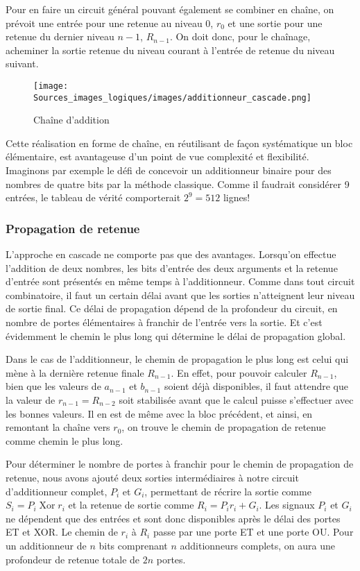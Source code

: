 \documentclass[11pt]{article}
\begin{document}
Pour en faire un circuit général pouvant également se combiner en
chaîne, on prévoit une entrée pour une retenue au niveau 0, \(r_0\) et
une sortie pour une retenue du dernier niveau \(n-1\), \(R_{n-1}\). On
doit donc, pour le chaînage, acheminer la sortie retenue du niveau
courant à l'entrée de retenue du niveau suivant.


\begin{figure}[htbp]
\centering
\texttt{[image: Sources\_images\_logiques/images/additionneur\_cascade.png]}
\caption{\label{fig:org24229ef}Chaîne d'addition}
\end{figure}

Cette réalisation en forme de chaîne, en réutilisant de façon
systématique un bloc élémentaire, est avantageuse d'un point de vue
complexité et flexibilité. Imaginons par exemple le défi de concevoir
un additionneur binaire pour des nombres de quatre bits par la méthode
classique. Comme il faudrait considérer 9 entrées, le tableau de
vérité comporterait \(2^9= 512\) lignes!

\subsubsection{Propagation de retenue}
\label{sec:org4957219}

L'approche en cascade ne comporte pas que des avantages. Lorsqu'on
effectue l'addition de deux nombres, les bits d'entrée des deux
arguments et la retenue d'entrée sont présentés en même temps à
l'additionneur.  Comme dans tout circuit combinatoire, il faut un
certain délai avant que les sorties n'atteignent leur niveau de sortie
final.  Ce délai de propagation dépend de la profondeur du circuit, en
nombre de portes élémentaires à franchir de l'entrée vers la
sortie.  Et c'est évidemment le chemin le plus long qui détermine le
délai de propagation global.  

Dans le cas de l'additionneur, le chemin de propagation le plus long
est celui qui mène à la dernière retenue finale \(R_{n-1}\).  En
effet, pour pouvoir calculer \(R_{n-1}\), bien que les valeurs de
\(a_{n-1}\) et \(b_{n-1}\) soient déjà disponibles, il faut attendre
que la valeur de \(r_{n-1} = R_{n-2}\) soit stabilisée avant que le
calcul puisse s'effectuer avec les bonnes valeurs. Il en est de même
avec la bloc précédent, et ainsi, en remontant la chaîne vers \(r_0\),
on trouve le chemin de propagation de retenue comme chemin le plus
long.

Pour déterminer le nombre de portes à franchir pour le chemin de
propagation de retenue, nous avons ajouté deux sorties intermédiaires
à notre circuit d'additionneur complet, \(P_i\) et \(G_i\), permettant
de récrire la sortie comme \(S_i = P_i  \operatorname{Xor} r_i\) et la retenue de
sortie comme \(R_i = P_i r_i + G_i\). Les signaux \(P_i\) et \(G_i\)
ne dépendent que des entrées et sont donc disponibles après le délai
des portes ET et XOR. Le chemin de \(r_i\) à \(R_i\) passe par une
porte ET et une porte OU. Pour un additionneur de \(n\) bits
comprenant \(n\) additionneurs complets, on aura une profondeur de
retenue totale de \(2n\) portes.
\end{document}
